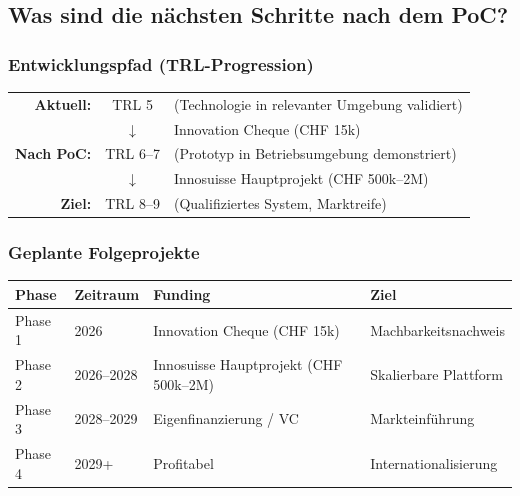 \documentclass[11pt,a4paper]{article}
\begin{document}
\subsection{Was sind die nächsten Schritte nach dem PoC?}

\subsubsection{Entwicklungspfad (TRL-Progression)}

\begin{center}
\begin{tabular}{rcl}
\textbf{Aktuell:} & TRL 5 & (Technologie in relevanter Umgebung validiert) \\
& $\downarrow$ & Innovation Cheque (CHF 15k) \\
\textbf{Nach PoC:} & TRL 6--7 & (Prototyp in Betriebsumgebung demonstriert) \\
& $\downarrow$ & Innosuisse Hauptprojekt (CHF 500k--2M) \\
\textbf{Ziel:} & TRL 8--9 & (Qualifiziertes System, Marktreife) \\
\end{tabular}
\end{center}

\subsubsection{Geplante Folgeprojekte}

\begin{table}[h]
\centering
\begin{tabular}{llll}
\toprule
\textbf{Phase} & \textbf{Zeitraum} & \textbf{Funding} & \textbf{Ziel} \\
\midrule
Phase 1 & 2026 & Innovation Cheque (CHF 15k) & Machbarkeitsnachweis \\
Phase 2 & 2026--2028 & Innosuisse Hauptprojekt (CHF 500k--2M) & Skalierbare Plattform \\
Phase 3 & 2028--2029 & Eigenfinanzierung / VC & Markteinführung \\
Phase 4 & 2029+ & Profitabel & Internationalisierung \\
\bottomrule
\end{tabular}
\end{table}
\end{document}
